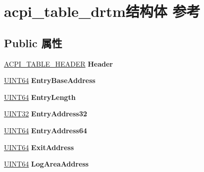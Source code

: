 \hypertarget{structacpi__table__drtm}{}\section{acpi\+\_\+table\+\_\+drtm结构体 参考}
\label{structacpi__table__drtm}
\subsection*{Public 属性}
\begin{DoxyCompactItemize}
\item 
\mbox{\label{structacpi__table__drtm_a1b4ca4bf2506ec2b17747c7d8a6fd73b}} 
\hyperlink{structacpi__table__header}{A\+C\+P\+I\+\_\+\+T\+A\+B\+L\+E\+\_\+\+H\+E\+A\+D\+ER} {\bfseries Header}
\item 
\mbox{\label{structacpi__table__drtm_afc8f508c2f9751091092f4d09a328397}} 
\hyperlink{_processor_bind_8h_a57be03562867144161c1bfee95ca8f7c}{U\+I\+N\+T64} {\bfseries Entry\+Base\+Address}
\item 
\mbox{\label{structacpi__table__drtm_a28bdfe8c6ed7f990bb76b6682fd0ebf7}} 
\hyperlink{_processor_bind_8h_a57be03562867144161c1bfee95ca8f7c}{U\+I\+N\+T64} {\bfseries Entry\+Length}
\item 
\mbox{\label{structacpi__table__drtm_aeac1cab09732db4a14b058cb861f5538}} 
\hyperlink{_processor_bind_8h_ae1e6edbbc26d6fbc71a90190d0266018}{U\+I\+N\+T32} {\bfseries Entry\+Address32}
\item 
\mbox{\label{structacpi__table__drtm_a602de60e6704b4c79cb2645df2f33022}} 
\hyperlink{_processor_bind_8h_a57be03562867144161c1bfee95ca8f7c}{U\+I\+N\+T64} {\bfseries Entry\+Address64}
\item 
\mbox{\label{structacpi__table__drtm_a1ba0740d7bdbe674d8ce27e39b02da33}} 
\hyperlink{_processor_bind_8h_a57be03562867144161c1bfee95ca8f7c}{U\+I\+N\+T64} {\bfseries Exit\+Address}
\item 
\mbox{\label{structacpi__table__drtm_a9893d34d2bbc5e80f99a70f5edb21754}} 
\hyperlink{_processor_bind_8h_a57be03562867144161c1bfee95ca8f7c}{U\+I\+N\+T64} {\bfseries Log\+Area\+Address}

\end{DoxyCompactItemize}
